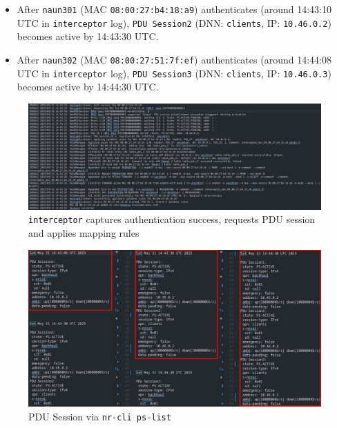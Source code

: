 \begin{itemize}
{\begin{itemize}
            \item After \texttt{naun301} (\ac{MAC} \texttt{08:00:27:b4:18:a9}) authenticates (around 14:43:10 \ac{UTC} in \texttt{interceptor} log), \texttt{PDU Session2} (\ac{DNN}: \texttt{clients}, \ac{IP}: \texttt{10.46.0.2}) becomes active by 14:43:30 \ac{UTC}.

            \item After \texttt{naun302} (\ac{MAC} \texttt{08:00:27:51:7f:ef}) authenticates (around 14:44:08 \ac{UTC} in \texttt{interceptor} log), \texttt{PDU Session3} (\ac{DNN}: \texttt{clients}, \ac{IP}: \texttt{10.46.0.3}) becomes active by 14:44:30 \ac{UTC}.
        \end{itemize}

        \begin{figure}
        \centering
            \includegraphics[width=1\linewidth]{figs/interceptor_eap_success.png}
            \caption{\texttt{interceptor} captures authentication success, requests \ac{PDU} session and applies mapping rules}
            \label{fig:interceptor_eap_success}
        \end{figure}

        \begin{figure}
            \centering
            \includegraphics[width=1\linewidth]{figs/ue_pdu_sessions.png}
            \caption{\ac{PDU} Session via \texttt{nr-cli ps-list}}
            \label{fig:ue_pdu_sessions}
        \end{figure}
    }


\end{itemize}
